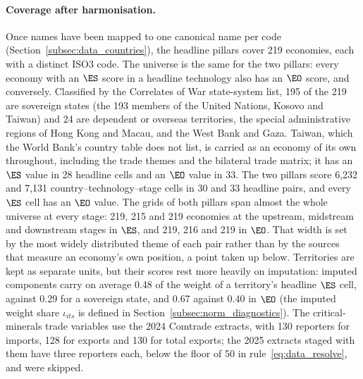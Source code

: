 \paragraph{Coverage after harmonisation.} Once names have been mapped to one canonical name
per code (Section~\ref{subsec:data_countries}), the headline pillars cover 219 economies, each
with a distinct ISO3 code. The universe is the same for the two pillars: every economy with an
$\ES$ score in a headline technology also has an $\EO$ score, and conversely. Classified by the
Correlates of War state-system list, 195 of the 219 are sovereign states (the 193 members of the
United Nations, Kosovo and Taiwan) and 24 are dependent or overseas territories, the special
administrative regions of Hong Kong and Macau, and the West Bank and Gaza. Taiwan, which the
World Bank's country table does not list, is carried as an economy of its own throughout,
including the trade themes and the bilateral trade matrix; it has an $\ES$ value in 28 headline
cells and an $\EO$ value in 33. The two pillars score 6,232 and 7,131 country--technology--stage
cells in 30 and 33 headline pairs, and every $\ES$ cell has an $\EO$ value. The grids of both
pillars span almost the whole universe at every stage: 219, 215 and 219 economies at the
upstream, midstream and downstream stages in $\ES$, and 219, 216 and 219 in $\EO$. That width is
set by the most widely distributed theme of each pair rather than by the sources that measure an
economy's own position, a point taken up below. Territories are kept as separate units, but
their scores rest more heavily on imputation: imputed components carry on average 0.48 of the
weight of a territory's headline $\ES$ cell, against 0.29 for a sovereign state, and 0.67 against
0.40 in $\EO$ (the imputed weight share $\iota_{its}$ is defined in
Section~\ref{subsec:norm_diagnostics}). The critical-minerals trade variables use the 2024
Comtrade extracts, with 130 reporters for imports, 128 for exports and 130 for total exports;
the 2025 extracts staged with them have three reporters each, below the floor of 50 in
rule~\eqref{eq:data_resolve}, and were skipped.

